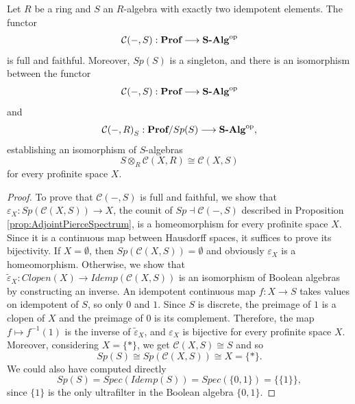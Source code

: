 \begin{proposition}
\label{prop:ContinuousExactlyIdempotent}
    Let $R$ be a ring and $S$ an $R$-algebra with exactly two idempotent elements. The functor
    \[ \mathcal{C}(-,S):\textbf{Prof}\longrightarrow{\textbf{S-Alg}}^{\mathrm{op}} \]
    is full and faithful. Moreover, $Sp(S)$ is a singleton, and there is an isomorphism between the functor
    \[ \mathcal{C}(-,S):\textbf{Prof}\longrightarrow{\textbf{S-Alg}}^{\mathrm{op}} \]
    and
    \[ {\mathcal{C}(-,R)}_S:\textbf{Prof}/Sp(S)\longrightarrow{\textbf{S-Alg}}^{\mathrm{op}}, \]
    establishing an isomorphism of $S$-algebras 
    \[ S\otimes_R\mathcal{C}(X,R) \cong \mathcal{C}(X,S) \]
    for every profinite space $X$.
    \begin{proof}
        To prove that $\mathcal{C}(-,S)$ is full and faithful, we show that $\varepsilon_X:Sp(\mathcal{C}(X,S))\to X$, the counit of $Sp\dashv \mathcal{C}(-,S)$ described in Proposition \ref{prop:AdjointPierceSpectrum}, is a homeomorphism for every profinite space $X$. Since it is a continuous map between Hausdorff spaces, it suffices to prove its bijectivity.
        If $X=\emptyset$, then $Sp(\mathcal{C}(X,S)) = \emptyset$ and obviously $\varepsilon_X$ is a homeomorphism. Otherwise, we show that $\tilde{\varepsilon}_X:Clopen(X)\to Idemp(\mathcal{C}(X,S))$ is an isomorphism of Boolean algebras by constructing an inverse. An idempotent continuous map $f:X\to S$ takes values on idempotent of $S$, so only $0$ and $1$. Since $S$ is discrete, the preimage of $1$ is a clopen of $X$ and the preimage of $0$ is its complement. Therefore, the map $f\longmapsto f^{-1}(1)$ is the inverse of $\tilde{\varepsilon}_X$, and $\varepsilon_X$ is bijective for every profinite space $X$. Moreover, considering $X = \{*\}$, we get $\mathcal{C}(X, S)\cong S$ and so
        \[ Sp(S) \cong Sp(\mathcal{C}(X,S))\cong X = \{*\}. \]
        We could also have computed directly
        \[ Sp(S) = Spec(Idemp(S)) = Spec(\{0,1\}) = \{ \{1\} \}, \]
        since $\{1\}$ is the only ultrafilter in the Boolean algebra $\{0,1\}$.


\end{proof}
\end{proposition}
